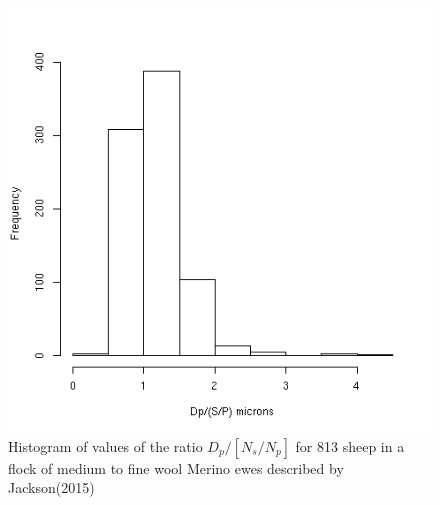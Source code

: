%

\begin{figure}[!h]
  \centering
   \includegraphics[width=1.0\textwidth]{DpovNsovNphist.png}
  \caption{Histogram of values of the ratio $D_{p}/[N_{s}/N_{p}]$ for 813 sheep in a flock of medium to fine wool Merino ewes described by Jackson(2015)~\cite{jack:15}}
  \label{fig:DpovNsovNphist}
\end{figure}

%

